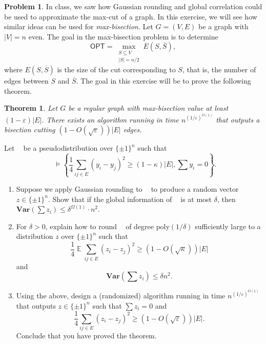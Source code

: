 \documentclass[11pt]{article}
\newtheorem*{theorem*}{Theorem}
\theoremstyle{definition}
\newtheorem{problem}[theorem]{Problem}
\newcommand{\poly}{\mathrm{poly}}
\renewcommand{\epsilon}{\varepsilon}
\newcommand{\eps}{\epsilon}
\DeclareMathOperator{\E}{\mathbb{E}} %
\DeclareMathOperator{\pE}{\widetilde{\mathbb{E}}} %
\newcommand{\Var}{\mathbf{Var}}
\newcommand{\OPT}{\mathsf{OPT}}
\begin{document}
\begin{problem}
  In class, we saw how Gaussian rounding and global correlation could be used to approximate the max-cut of a graph. In this exercise, we will see how similar ideas can be used for \emph{max-bisection}. Let $G = (V,E)$ be a graph with $|V|=n$ even. The goal in the max-bisection problem is to determine
  \[ \OPT = \max_{\substack{S \subseteq V \\ |S| = n/2}} E(S,\overline{S}), \]
  where $E(S,\overline{S})$ is the size of the cut corresponding to $S$, that is, the number of edges between $S$ and $\overline{S}$. The goal in this exercise will be to prove the following theorem.

  \begin{theorem*}
    Let $G$ be a regular graph with max-bisection value at least $(1-\eps) |E|$. There exists an algorithm running in time $n^{(1/\eps)^{O(1)}}$ that outputs a bisection cutting $(1-O(\sqrt{\eps})) |E|$ edges.
  \end{theorem*}

  Let $\pE$ be a pseudodistribution over $\{\pm 1\}^n$ such that
  \[ \pE \vDash \left\{ \frac{1}{4} \sum_{ij \in E} (y_i-y_j)^2 \ge (1 - \kappa) |E| , \sum y_i = 0 \right\}. \]

  \begin{enumerate}
    \item Suppose we apply Gaussian rounding to $\pE$ to produce a random vector $z \in \{\pm 1\}^n$. Show that if the global information of $\pE$ is at most $\delta$, then $\Var \left(\sum z_i\right) \le \delta^{\Omega(1)} \cdot n^2$.

    \item For $\delta > 0$, explain how to round $\pE$ of degree $\poly(1/\delta)$ sufficiently large to a distribution $z$ over $\{\pm 1\}^n$ such that
    \[ \frac{1}{4} \E \sum_{ij \in E} (z_i - z_j)^2 \ge (1 - O(\sqrt{\kappa}))|E| \]
    and
    \[ \Var \left( \sum z_i \right) \le \delta n^2. \]

    \item Using the above, design a (randomized) algorithm running in time $n^{(1/\eps)^{O(1)}}$ that outputs $z \in \{\pm 1\}^n$ such that $\sum z_i = 0$ and
    \[ \frac{1}{4} \sum_{ij \in E} (z_i - z_j)^2 \ge (1-O(\sqrt{\eps})) |E|. \]
    Conclude that you have proved the theorem.
  \end{enumerate}
\end{problem}
\end{document}
